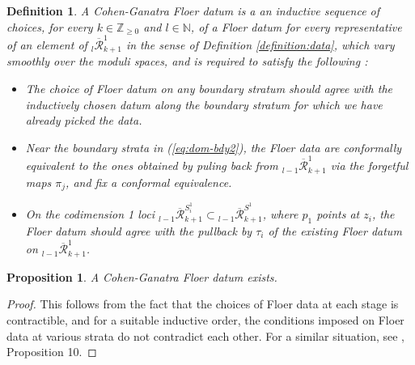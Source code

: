 \documentclass[a4paper]{article}
\newtheorem{definition}[theorem]{Definition}
\newtheorem{proposition}[theorem]{Proposition}
\numberwithin{equation}{section}
\begin{document}
\begin{definition}
A Cohen-Ganatra Floer datum is a an inductive sequence of choices, for every $k\in\mathbb{Z}_{\geq0}$ and $l\in\mathbb{N}$, of a Floer datum for every representative of an element of ${}_l\overline{\mathcal{R}}_{k+1}^1$ in the sense of Definition \ref{definition:data}, which vary smoothly over the moduli spaces, and is required to satisfy the following :
\begin{itemize}
	\item[(i)] The choice of Floer datum on any boundary stratum should agree with the inductively chosen datum along the boundary stratum for which we have already picked the data.
	\item[(ii)] Near the boundary strata in (\ref{eq:dom-bdy2}), the Floer data are conformally equivalent to the ones obtained by puling back from ${}_{l-1}\overline{\mathcal{R}}_{k+1}^1$ via the forgetful maps $\pi_j$, and fix a conformal equivalence.
	\item[(iii)] On the codimension 1 loci ${}_{l-1}\overline{\mathcal{R}}_{k+1}^{S_i^1}\subset{}_{l-1}\overline{\mathcal{R}}_{k+1}^{S^1}$, where $p_1$ points at $z_i$, the Floer datum should agree with the pullback by $\tau_i$ of the existing Floer datum on ${}_{l-1}\overline{\mathcal{R}}_{k+1}^1$.
\end{itemize}
\end{definition}

\begin{proposition}
A Cohen-Ganatra Floer datum exists.
\end{proposition}
\begin{proof}
This follows from the fact that the choices of Floer data at each stage is contractible, and for a suitable inductive order, the conditions imposed on Floer data at various strata do not contradict each other. For a similar situation, see \cite{sg1}, Proposition 10.
\end{proof}
\end{document}
